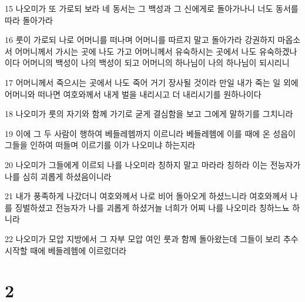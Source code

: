 \par 15 나오미가 또 가로되 보라 네 동서는 그 백성과 그 신에게로 돌아가나니 너도 동서를 따라 돌아가라
\par 16 룻이 가로되 나로 어머니를 떠나며 어머니를 따르지 말고 돌아가라 강권하지 마옵소서 어머니께서 가시는 곳에 나도 가고 어머니께서 유숙하시는 곳에서 나도 유숙하겠나이다 어머니의 백성이 나의 백성이 되고 어머니의 하나님이 나의 하나님이 되시리니
\par 17 어머니께서 죽으시는 곳에서 나도 죽어 거기 장사될 것이라 만일 내가 죽는 일 외에 어머니와 떠나면 여호와께서 내게 벌을 내리시고 더 내리시기를 원하나이다
\par 18 나오미가 룻의 자기와 함께 가기로 굳게 결심함을 보고 그에게 말하기를 그치니라
\par 19 이에 그 두 사람이 행하여 베들레헴까지 이르니라 베들레헴에 이를 때에 온 성읍이 그들을 인하여 떠들며 이르기를 이가 나오미냐 하는지라
\par 20 나오미가 그들에게 이르되 나를 나오미라 칭하지 말고 마라라 칭하라 이는 전능자가 나를 심히 괴롭게 하셨음이니라
\par 21 내가 풍족하게 나갔더니 여호와께서 나로 비어 돌아오게 하셨느니라 여호와께서 나를 징벌하셨고 전능자가 나를 괴롭게 하셨거늘 너희가 어찌 나를 나오미라 칭하느뇨 하니라
\par 22 나오미가 모압 지방에서 그 자부 모압 여인 룻과 함께 돌아왔는데 그들이 보리 추수 시작할 때에 베들레헴에 이르렀더라

\chapter{2}

